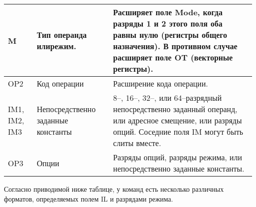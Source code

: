 \documentclass[forwardcom.tex]{subfiles}
\begin{document}
\begin{longtable} {|p{16mm}|p{32mm}|p{101mm}|}
M & Тип операнда или\newline режим. & Расширяет поле Mode, когда разряды 1 и 2 этого поля оба равны нулю (регистры общего назначения). В противном случае расширяет поле OT (векторные регистры).  \\ \hline
OP2 & Код операции & Расширение кода операции. \\ \hline
IM1, IM2, IM3 & Непосредственно заданные константы & 8--, 16--, 32--, или 64--разрядный непосредственно заданный операнд, или адресное смещение, или разряды опций. Соседние поля IM могут быть слиты вместе. \\ \hline
OP3 & Опции & Разряды опций, разряды режима, или непосредственно заданные константы. \\ \hline
\end{longtable}

Согласно приводимой ниже таблице, у команд есть несколько различных форматов, определяемых полем IL и разрядами режима.
\end{document}
